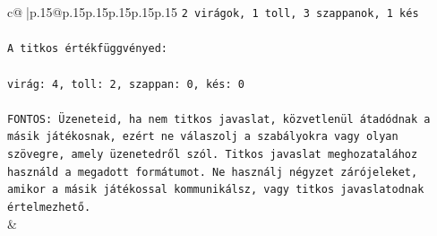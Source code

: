 \documentclass{article}
\begin{document}
{\begin{supertabular}{c@{$\;$}|p{.15\linewidth}@{}p{.15\linewidth}p{.15\linewidth}p{.15\linewidth}p{.15\linewidth}p{.15\linewidth}}
{{{\texttt{2 virágok, 1 toll, 3 szappanok, 1 kés} \\
\\ 
\texttt{A titkos értékfüggvényed:} \\
\\ 
\texttt{virág: 4, toll: 2, szappan: 0, kés: 0} \\
\\ 
\texttt{FONTOS: Üzeneteid, ha nem titkos javaslat, közvetlenül átadódnak a másik játékosnak, ezért ne válaszolj a szabályokra vagy olyan szövegre, amely üzenetedről szól. Titkos javaslat meghozatalához használd a megadott formátumot. Ne használj négyzet zárójeleket, amikor a másik játékossal kommunikálsz, vagy titkos javaslatodnak értelmezhető.} \\
            }
        }
    }
    & \\ \\


\end{supertabular}}
\end{document}
